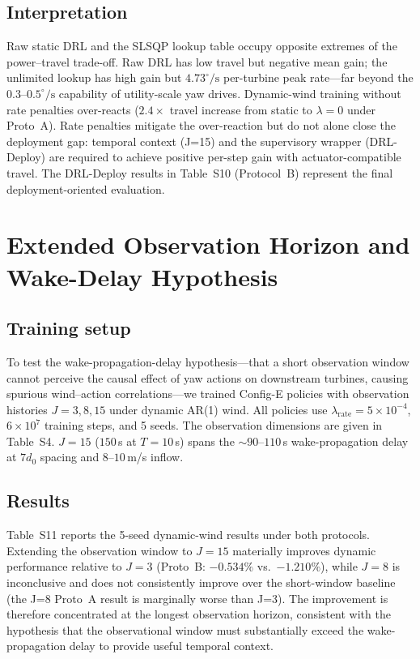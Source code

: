\documentclass{article}
\begin{document}
\subsection{Interpretation}

Raw static DRL and the SLSQP lookup table occupy opposite extremes of the power--travel trade-off. Raw DRL has low travel but negative mean gain; the unlimited lookup has high gain but $4.73^\circ\!/\!\mathrm{s}$ per-turbine peak rate---far beyond the $0.3$--$0.5^\circ\!/\!\mathrm{s}$ capability of utility-scale yaw drives. Dynamic-wind training without rate penalties over-reacts ($2.4{\times}$ travel increase from static to $\lambda{=}0$ under Proto~A). Rate penalties mitigate the over-reaction but do not alone close the deployment gap: temporal context (J=15) and the supervisory wrapper (DRL-Deploy) are required to achieve positive per-step gain with actuator-compatible travel. The DRL-Deploy results in Table~S10 (Protocol~B) represent the final deployment-oriented evaluation.

\section{Extended Observation Horizon and Wake-Delay Hypothesis}\label{sec:j_extended}

\subsection{Training setup}

To test the wake-propagation-delay hypothesis---that a short observation window cannot perceive the causal effect of yaw actions on downstream turbines, causing spurious wind--action correlations---we trained Config-E policies with observation histories $J{=}3,8,15$ under dynamic AR(1) wind. All policies use $\lambda_\mathrm{rate}{=}5{\times}10^{-4}$, $6{\times}10^{7}$ training steps, and 5 seeds. The observation dimensions are given in Table~S4. $J{=}15$ ($150$\,s at $T{=}10$\,s) spans the ${\sim}90$--$110$\,s wake-propagation delay at $7d_0$ spacing and $8$--$10$\,m/s inflow.

\subsection{Results}

Table~S11 reports the 5-seed dynamic-wind results under both protocols. Extending the observation window to $J{=}15$ materially improves dynamic performance relative to $J{=}3$ (Proto~B: $-0.534\%$ vs.\ $-1.210\%$), while $J{=}8$ is inconclusive and does not consistently improve over the short-window baseline (the J=8 Proto~A result is marginally worse than J=3). The improvement is therefore concentrated at the longest observation horizon, consistent with the hypothesis that the observational window must substantially exceed the wake-propagation delay to provide useful temporal context.
\end{document}
